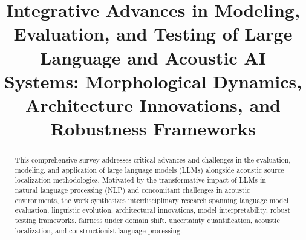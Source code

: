 \title{Integrative Advances in Modeling, Evaluation, and Testing of Large Language and Acoustic AI Systems: Morphological Dynamics, Architecture Innovations, and Robustness Frameworks}
\maketitle

\begin{abstract}
This comprehensive survey addresses critical advances and challenges in the evaluation, modeling, and application of large language models (LLMs) alongside acoustic source localization methodologies. Motivated by the transformative impact of LLMs in natural language processing (NLP) and concomitant challenges in acoustic environments, the work synthesizes interdisciplinary research spanning language model evaluation, linguistic evolution, architectural innovations, model interpretability, robust testing frameworks, fairness under domain shift, uncertainty quantification, acoustic localization, and constructionist language processing.


\end{abstract}
